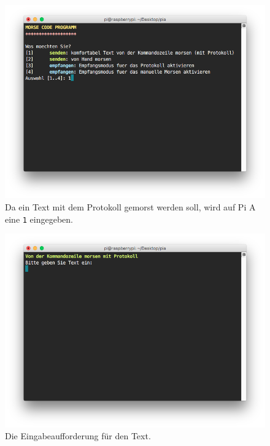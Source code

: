 \documentclass[12pt, a4paper]{article}
\begin{document}
\newpage
\begin{figure}[H]
	\centering
	\includegraphics[width=1.0\textwidth]{sshot_3.png}
	\caption{Da ein Text mit dem Protokoll gemorst werden soll, wird auf Pi A eine \texttt{1} eingegeben.}
\end{figure}

\newpage
\begin{figure}[H]
	\centering
	\includegraphics[width=1.0\textwidth]{sshot_4.png}
	\caption{Die Eingabeaufforderung für den Text.}
\end{figure}
\end{document}

